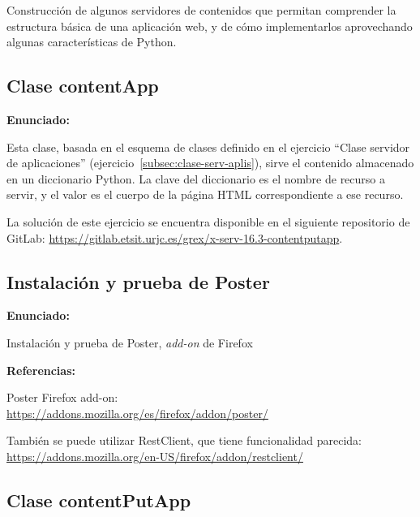 Construcción de algunos servidores de contenidos que permitan comprender la estructura básica de una aplicación web, y de cómo implementarlos aprovechando algunas características de Python.

\subsection{Clase contentApp}
\label{subsec:contentapp}

\textbf{Enunciado:}

Esta clase, basada en el esquema de clases definido en el ejercicio ``Clase servidor de aplicaciones'' (ejercicio~\ref{subsec:clase-serv-aplis}), sirve el contenido almacenado en un diccionario Python. La clave del diccionario es el nombre de recurso a servir, y el valor es el cuerpo de la página HTML correspondiente a ese recurso.

La solución de este ejercicio se encuentra disponible en el siguiente repositorio de 
GitLab: \url{https://gitlab.etsit.urjc.es/grex/x-serv-16.3-contentputapp}.


\subsection{Instalación y prueba de Poster}
\label{subsec:inst-poster}

\textbf{Enunciado:}

Instalación y prueba de Poster, \emph{add-on} de Firefox

\textbf{Referencias:}

Poster Firefox add-on: \\
\url{https://addons.mozilla.org/es/firefox/addon/poster/}

También se puede utilizar RestClient, que tiene funcionalidad parecida: \\
\url{https://addons.mozilla.org/en-US/firefox/addon/restclient/}

\subsection{Clase contentPutApp}
\label{subsec:contentputapp}


